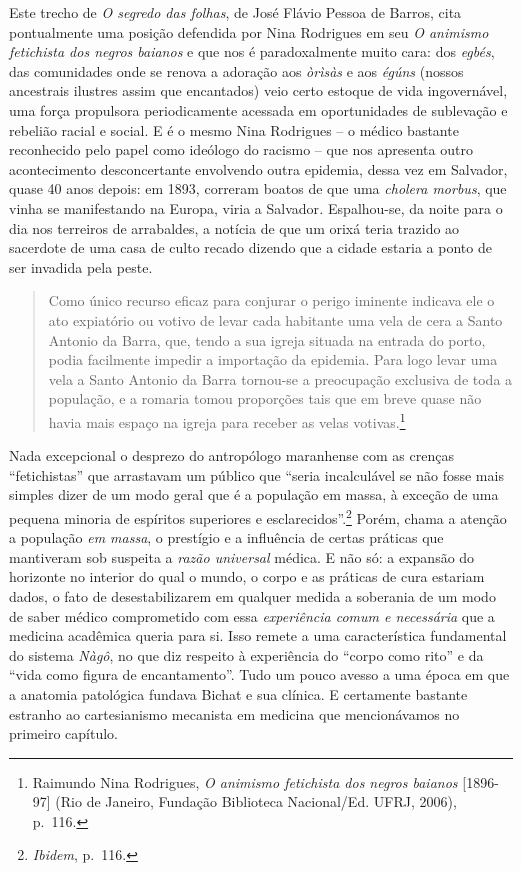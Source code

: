 Este trecho de \emph{O segredo das folhas}, de José Flávio Pessoa de
Barros, cita pontualmente uma posição defendida por Nina Rodrigues em
seu \emph{O animismo fetichista dos negros baianos} e que nos é
paradoxalmente muito cara: dos \emph{egbés}, das comunidades onde se
renova a adoração aos \emph{òrìsàs} e aos \emph{égúns} (nossos
ancestrais ilustres assim que encantados) veio certo estoque de vida
ingovernável, uma força propulsora periodicamente acessada em
oportunidades de sublevação e rebelião racial e social. E é o mesmo Nina
Rodrigues -- o médico bastante reconhecido pelo papel como ideólogo do
racismo -- que nos apresenta outro acontecimento desconcertante
envolvendo outra epidemia, dessa vez em Salvador, quase 40 anos depois:
em 1893, correram boatos de que uma \emph{cholera morbus}, que vinha se
manifestando na Europa, viria a Salvador\emph{.} Espalhou-se, da noite
para o dia nos terreiros de arrabaldes, a notícia de que um orixá teria
trazido ao sacerdote de uma casa de culto recado dizendo que a cidade
estaria a ponto de ser invadida pela peste.

\begin{quote}
Como único recurso eficaz para conjurar o perigo iminente indicava ele o
ato expiatório ou votivo de levar cada habitante uma vela de cera a
Santo Antonio da Barra, que, tendo a sua igreja situada na entrada do
porto, podia facilmente impedir a importação da epidemia. Para logo
levar uma vela a Santo Antonio da Barra tornou-se a preocupação
exclusiva de toda a população, e a romaria tomou proporções tais que em
breve quase não havia mais espaço na igreja para receber as velas
votivas.\footnote{Raimundo Nina Rodrigues, \emph{O animismo fetichista
  dos negros baianos} {[}1896-97{]} (Rio de Janeiro, Fundação Biblioteca
  Nacional/Ed. UFRJ, 2006), p.~116.}
\end{quote}

Nada excepcional o desprezo do antropólogo maranhense com as crenças
``fetichistas'' que arrastavam um público que ``seria incalculável se
não fosse mais simples dizer de um modo geral que é a população em
massa, à exceção de uma pequena minoria de espíritos superiores e
esclarecidos''.\footnote{\emph{Ibidem}, p.~116.} Porém, chama a atenção
a população \emph{em massa}, o prestígio e a influência de certas
práticas que mantiveram sob suspeita a \emph{razão universal} médica. E
não só: a expansão do horizonte no interior do qual o mundo, o corpo e
as práticas de cura estariam dados, o fato de desestabilizarem em
qualquer medida a soberania de um modo de saber médico comprometido com
essa \emph{experiência comum e necessária} que a medicina acadêmica
queria para si. Isso remete a uma característica fundamental do sistema
\emph{Nàgô}, no que diz respeito à experiência do ``corpo como rito'' e
da ``vida como figura de encantamento''. Tudo um pouco avesso a uma
época em que a anatomia patológica fundava Bichat e sua clínica. E
certamente bastante estranho ao cartesianismo mecanista em medicina que
mencionávamos no primeiro capítulo.

